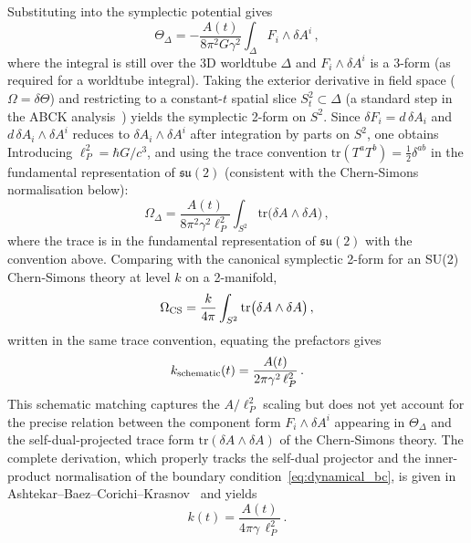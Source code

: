\documentclass[aps,prd,twocolumn,10pt,superscriptaddress,nofootinbib]{revtex4-2}
\begin{document}
Substituting into the symplectic potential gives
\begin{equation}
\Theta_\Delta
  = -\frac{A(t)}{8\pi^2 G \gamma^2}
    \int_\Delta F_i \wedge \delta A^i\,,
\end{equation}
where the integral is still over the 3D worldtube $\Delta$ and
$F_i \wedge \delta A^i$ is a 3-form (as required for a worldtube
integral).  Taking the exterior derivative in field space
($\Omega = \delta\Theta$) and restricting to a constant-$t$ spatial
slice $S^2_t \subset \Delta$ (a standard step in the ABCK
analysis~\cite{Ashtekar1998}) yields the symplectic 2-form on $S^2$.
Since $\delta F_i = d\,\delta A_i$ and $d\,\delta A_i \wedge \delta A^i$
reduces to $\delta A_i \wedge \delta A^i$ after integration by
parts on $S^2$, one obtains  Introducing $\ell_P^2 = \hbar G/c^3$, and using the
trace convention $\mathrm{tr}(T^a T^b) = \tfrac{1}{2}\delta^{ab}$
in the fundamental representation of $\mathfrak{su}(2)$ (consistent
with the Chern-Simons normalisation below):
\begin{equation}
\Omega_\Delta
  = \frac{A(t)}{8\pi^2 \gamma^2 \ell_P^2}
    \int_{S^2} \mathrm{tr}\bigl(
      \delta A \wedge \delta A\bigr)\,,
\label{eq:symplectic_2form}
\end{equation}
where the trace is in the fundamental representation of
$\mathfrak{su}(2)$ with the convention above.  Comparing with the
canonical symplectic 2-form for an SU(2) Chern-Simons theory at
level $k$ on a 2-manifold,
\begin{equation}
\Omega_{\rm CS}
  = \frac{k}{4\pi}
    \int_{S^2} \mathrm{tr}\bigl(
      \delta A \wedge \delta A\bigr)\,,
\end{equation}
written in the same trace convention, equating the prefactors
gives
\begin{equation}
k_{\rm schematic}(t) = \frac{A(t)}{2\pi\gamma^2\,\ell_P^2}\,.
\label{eq:k_schematic}
\end{equation}
This schematic matching captures the $A/\ell_P^2$ scaling but
does not yet account for the precise relation between the
component form $F_i \wedge \delta A^i$ appearing in
$\Theta_\Delta$ and the self-dual-projected trace form
$\mathrm{tr}(\delta A \wedge \delta A)$ of the Chern-Simons
theory.  The complete derivation, which properly tracks the
self-dual projector and the inner-product normalisation of the
boundary condition~\eqref{eq:dynamical_bc}, is given in
Ashtekar--Baez--Corichi--Krasnov~\cite{Ashtekar1998} and yields
\begin{equation}
\boxed{k(t) = \frac{A(t)}{4\pi\gamma\,\ell_P^2}\,.}
\label{eq:k_derived}
\end{equation}
\end{document}
